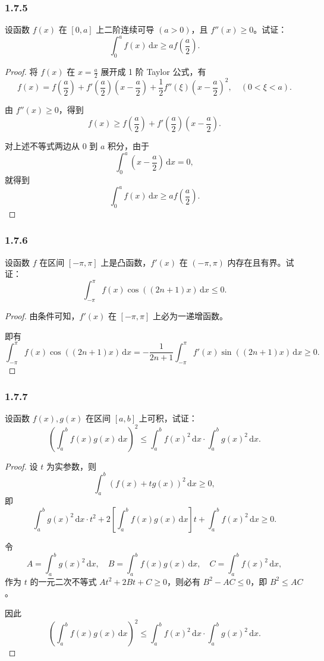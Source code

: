 \documentclass[12pt]{ctexart}
\begin{document}
\subsubsection*{1.7.5}

设函数 $f(x)$ 在 $[0, a]$ 上二阶连续可导 $(a > 0)$，且 $f''(x) \geq 0$。试证：
\[
\int_{0}^{a} f(x) \, \mathrm{d}x \geq a f\left(\frac{a}{2}\right).
\]

\begin{proof}
将 $f(x)$ 在 $x = \frac{a}{2}$ 展开成 1 阶 Taylor 公式，有
\[
f(x) = f\left(\frac{a}{2}\right) + f'\left(\frac{a}{2}\right) \left(x - \frac{a}{2}\right) + \frac{1}{2} f''(\xi) \left(x - \frac{a}{2}\right)^2, \quad (0 < \xi < a).
\]

由 $f''(x) \geq 0$，得到
\[
f(x) \geq f\left(\frac{a}{2}\right) + f'\left(\frac{a}{2}\right) \left(x - \frac{a}{2}\right).
\]

对上述不等式两边从 $0$ 到 $a$ 积分，由于
\[
\int_{0}^{a} \left(x - \frac{a}{2}\right) \, \mathrm{d}x = 0,
\]
就得到
\[
\int_{0}^{a} f(x) \, \mathrm{d}x \geq a f\left(\frac{a}{2}\right).
\]
\end{proof}

\subsubsection*{1.7.6}

设函数 $f$ 在区间 $[-\pi, \pi]$ 上是凸函数，$f'(x)$ 在 $(-\pi, \pi)$ 内存在且有界。试证：
\[
\int_{-\pi}^{\pi} f(x) \cos((2n+1)x) \, \mathrm{d}x \leq 0.
\]
\begin{proof}
由条件可知，$f'(x)$ 在 $[-\pi, \pi]$ 上必为一递增函数。

即有
\[
\int_{-\pi}^{\pi} f(x) \cos((2n+1)x) \, \mathrm{d}x = -\frac{1}{2n+1} \int_{-\pi}^{\pi} f'(x) \sin((2n+1)x) \, \mathrm{d}x \geq 0.
\]
\end{proof}

\subsubsection*{1.7.7}

设函数 $f(x), g(x)$ 在区间 $[a, b]$ 上可积，试证：
\[
\left( \int_{a}^{b} f(x) g(x) \, \mathrm{d}x \right)^2 \leq \int_{a}^{b} f(x)^2 \, \mathrm{d}x \cdot \int_{a}^{b} g(x)^2 \, \mathrm{d}x.
\]

\begin{proof}
设 $t$ 为实参数，则
\[
\int_{a}^{b} \left( f(x) + t g(x) \right)^2 \, \mathrm{d}x \geq 0,
\]
即
\[
\int_{a}^{b} g(x)^2 \, \mathrm{d}x \cdot t^2 + 2 \left[ \int_{a}^{b} f(x) g(x) \, \mathrm{d}x \right] t + \int_{a}^{b} f(x)^2 \, \mathrm{d}x \geq 0.
\]

令
\[
A = \int_{a}^{b} g(x)^2 \, \mathrm{d}x, \quad B = \int_{a}^{b} f(x) g(x) \, \mathrm{d}x, \quad C = \int_{a}^{b} f(x)^2 \, \mathrm{d}x,
\]
作为 $t$ 的一元二次不等式 $A t^2 + 2Bt + C \geq 0$，则必有 $B^2 - AC \leq 0$，即 $B^2 \leq AC$。

因此
\[
\left( \int_{a}^{b} f(x) g(x) \, \mathrm{d}x \right)^2 \leq \int_{a}^{b} f(x)^2 \, \mathrm{d}x \cdot \int_{a}^{b} g(x)^2 \, \mathrm{d}x.
\]
\end{proof}
\end{document}
